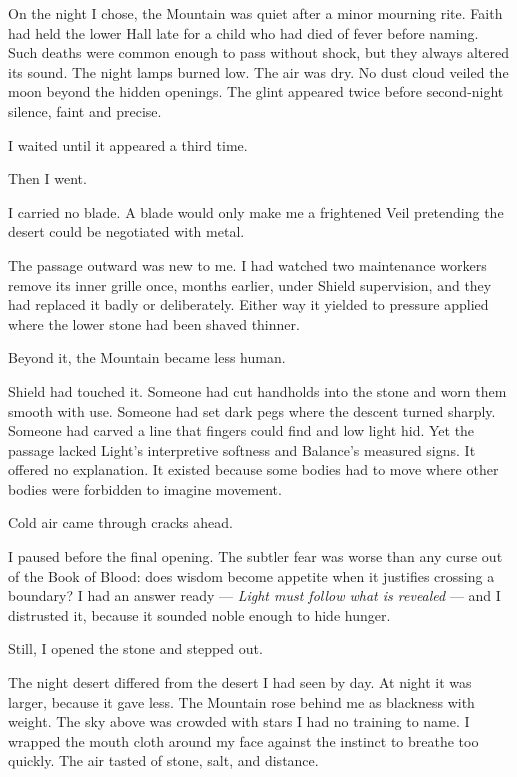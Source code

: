 On the night I chose, the Mountain was quiet after a minor mourning rite. Faith had held the lower Hall late for a child who had died of fever before naming. Such deaths were common enough to pass without shock, but they always altered its sound. The night lamps burned low. The air was dry. No dust cloud veiled the moon beyond the hidden openings. The glint appeared twice before second-night silence, faint and precise.\par

I waited until it appeared a third time.\par

Then I went.\par

I carried no blade. A blade would only make me a frightened Veil pretending the desert could be negotiated with metal.\par

The passage outward was new to me. I had watched two maintenance workers remove its inner grille once, months earlier, under Shield supervision, and they had replaced it badly or deliberately. Either way it yielded to pressure applied where the lower stone had been shaved thinner.\par

Beyond it, the Mountain became less human.\par

Shield had touched it. Someone had cut handholds into the stone and worn them smooth with use. Someone had set dark pegs where the descent turned sharply. Someone had carved a line that fingers could find and low light hid. Yet the passage lacked Light's interpretive softness and Balance's measured signs. It offered no explanation. It existed because some bodies had to move where other bodies were forbidden to imagine movement.\par

Cold air came through cracks ahead.\par

I paused before the final opening. The subtler fear was worse than any curse out of the Book of Blood: does wisdom become appetite when it justifies crossing a boundary? I had an answer ready --- \textit{Light must follow what is revealed} --- and I distrusted it, because it sounded noble enough to hide hunger.\par

Still, I opened the stone and stepped out.\par

The night desert differed from the desert I had seen by day. At night it was larger, because it gave less. The Mountain rose behind me as blackness with weight. The sky above was crowded with stars I had no training to name. I wrapped the mouth cloth around my face against the instinct to breathe too quickly. The air tasted of stone, salt, and distance.\par


